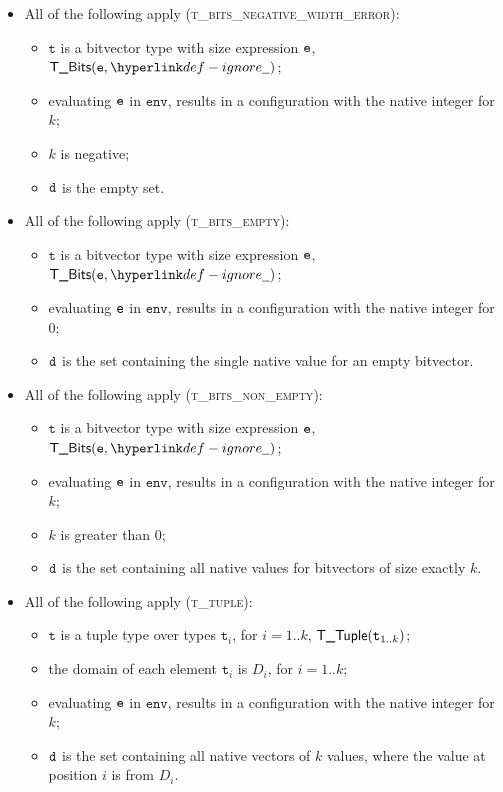\documentclass{book}
\newcommand\env[0]{\texttt{env}}
\newcommand\vt[0]{\texttt{t}}
\begin{document}
\begin{itemize}
  \item All of the following apply (\textsc{t\_bits\_negative\_width\_error}):
  \begin{itemize}
    \item $\vt$ is a bitvector type with size expression $\texttt{e}$, $\TBits(\ve, \Ignore)$;
    \item evaluating $\texttt{e}$ in $\env$, results in a configuration with the native integer for $k$;
    \item $k$ is negative;
    \item $\texttt{d}$ is the empty set.
  \end{itemize}

  \item All of the following apply (\textsc{t\_bits\_empty}):
  \begin{itemize}
    \item $\vt$ is a bitvector type with size expression $\texttt{e}$, $\TBits(\ve, \Ignore)$;
    \item evaluating $\texttt{e}$ in $\env$, results in a configuration with the native integer for $0$;
    \item $\texttt{d}$ is the set containing the single native value for an empty bitvector.
  \end{itemize}

  \item All of the following apply (\textsc{t\_bits\_non\_empty}):
  \begin{itemize}
    \item $\vt$ is a bitvector type with size expression $\texttt{e}$, $\TBits(\ve, \Ignore)$;
    \item evaluating $\texttt{e}$ in $\env$, results in a configuration with the native integer for $k$;
    \item $k$ is greater than $0$;
    \item $\texttt{d}$ is the set containing all native values for bitvectors of size exactly $k$.
  \end{itemize}

  \item All of the following apply (\textsc{t\_tuple}):
  \begin{itemize}
    \item $\vt$ is a tuple type over types $\vt_i$, for $i=1..k$, $\TTuple(\vt_{1..k})$;
    \item the domain of each element $\vt_i$ is $D_i$, for $i=1..k$;
    \item evaluating $\texttt{e}$ in $\env$, results in a configuration with the native integer for $k$;
    \item $\texttt{d}$ is the set containing all native vectors of $k$ values, where the value at position $i$
    is from $D_i$.
  \end{itemize}


\end{itemize}
\end{document}
